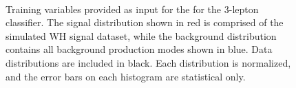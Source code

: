 {\begin{figure}[h!]
 \\
\caption{Training variables provided as input for the for the 3-lepton classifier. The signal distribution shown in red is comprised of the simulated WH signal dataset, while the background distribution contains all background production modes shown in blue. Data distributions are included in black. Each distribution is normalized, and the error bars on each histogram are statistical only. }
\label{fig:hmm3lepVars}
\end{figure}
\clearpage
}

